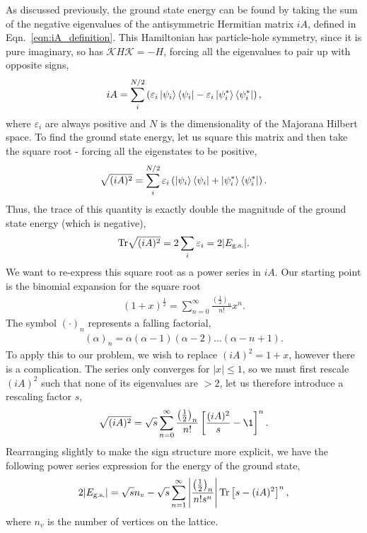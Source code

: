 As discussed previously, the ground state energy can be found by taking the sum of the negative eigenvalues of the antisymmetric Hermitian matrix $iA$, defined in Eqn.~\ref{eqn:iA_definition}. This Hamiltonian has particle-hole symmetry, since it is pure imaginary, so has $\mathcal{K} H \mathcal{K} = -H$, forcing all the eigenvalues to pair up with opposite signs,
\begin{align}
    iA = \sum_{i}^{N/2} \left ( \varepsilon_i \ket{\psi_i}\bra{\psi_i}  - \varepsilon_i \ket{\psi_i^*}\bra{\psi_i^*}\right ),
\end{align}
where $\varepsilon_i$ are always positive and $N$ is the dimensionality of the Majorana Hilbert space. To find the ground state energy, let us square this matrix and then take the square root - forcing all the eigenstates to be positive,
\begin{align}
    \sqrt{(iA)^2} = \sum_{i}^{N/2}
    \varepsilon_i \left (\ket{\psi_i}\bra{\psi_i} + \ket{\psi_i^*}\bra{\psi_i^*}\right ).
\end{align}
Thus, the trace of this quantity is exactly double the magnitude of the ground state energy (which is negative),
\begin{align}\label{eqn:ground_state}
    \textup{Tr}\sqrt{(iA)^2} = 2\sum_i \varepsilon_i = 2|E_\textup{g.s.}|.
\end{align}
We want to re-express this square root as a power series in $iA$. Our starting point is the binomial expansion for the square root
\begin{align}
    (1+x)^{\frac 12} = \sum_{n = 0}^\infty \frac{\left (\frac 12\right )_n}{n!}x^n.
\end{align}
The symbol $(\cdot)_n$ represents a falling factorial, 
\begin{align}
    (\alpha)_n = \alpha(\alpha-1)(\alpha-2)...(\alpha-n+1).
\end{align}
To apply this to our problem, we wish to replace $(iA)^2 = 1+x$, however there is a complication. The series only converges for $|x| \leq 1$, so we must first rescale $(iA)^2$ such that none of its eigenvalues are $>2$, let us therefore introduce a rescaling factor $s$,
\begin{align}
    \sqrt{(iA)^2} = \sqrt s \sum_{n = 0}^\infty \frac{\left (\frac 12\right )_n}{n!}
    \left [ 
        \frac{(iA)^2}{s} - \1
    \right ]^n.
\end{align}
Rearranging slightly to make the sign structure more explicit, we have the following power series expression for the energy of the ground state, 
\begin{align} \label{eqn:energy_as_power_series}
   2|E_\textup{g.s.}| = \sqrt s n_v - 
   \sqrt s \sum_{n = 1}^\infty 
    \left |  
    \frac{\left (\frac 12\right )_n}{n!s^n}
    \right |
    \textup{Tr}
    \left [ 
        s - (iA)^2
    \right ]^n,
\end{align}
where $n_v$ is the number of vertices on the lattice. 

